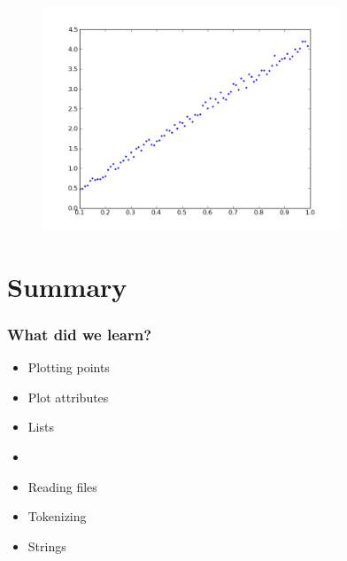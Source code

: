 \documentclass[14pt,compress]{beamer}
\newcommand{\kwrd}[1]{ \texttt{\textbf{\color{blue}{#1}}}  }
\begin{document}
\begin{frame}[fragile]
\begin{figure}
\includegraphics[width=3.5in]{data/L-Tsq.png}
\end{figure}
\end{frame}

\section {Summary}
\begin{frame}[fragile]
\frametitle{What did we learn?}
\begin{itemize}
  \item Plotting points
  \item Plot attributes
  \item Lists
  \item \kwrd{for}
  \item Reading files
  \item Tokenizing
  \item Strings
\end{itemize}
\end{frame}
\end{document}
